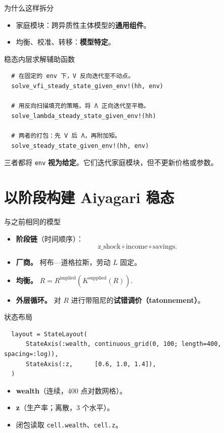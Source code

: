 \documentclass[10pt,aspectratio=169]{beamer}
\begin{document}
\begin{frame}{为什么这样拆分}
  \begin{itemize}
    \item 家庭模块：跨异质性主体模型的\textbf{通用组件}。
    \item 均衡、校准、转移：\textbf{模型特定}。
  \end{itemize}
\end{frame}

\begin{frame}[fragile]{稳态内层求解辅助函数}
  \begin{lstlisting}
  # 在固定的 env 下，V 反向迭代至不动点。
  solve_vfi_steady_state_given_env!(hh, env)

  # 用反向扫描填充的策略，将 Λ 正向迭代至平稳。
  solve_lambda_steady_state_given_env!(hh)

  # 两者的打包：先 V 后 Λ，再附加矩。
  solve_steady_state_given_env!(hh, env)
  \end{lstlisting}
  三者都将 \texttt{env} \textbf{视为给定}。它们迭代家庭模块，但不更新价格或参数。
\end{frame}

\section{以阶段构建 Aiyagari 稳态}

\begin{frame}{与之前相同的模型}
  \begin{itemize}
    \item \textbf{阶段链}（时间顺序）：\[ \text{z\_shock} \circ \text{income} \circ \text{savings}. \]
    \item \textbf{厂商。} 柯布—道格拉斯，劳动 $L$ 固定。
    \item \textbf{均衡。} $R = R^{\mathrm{implied}}(K^{\mathrm{supplied}}(R))$.
    \item \textbf{外层循环。} 对 $R$ 进行带阻尼的\textbf{试错调价（tatonnement）}。
  \end{itemize}
\end{frame}

\begin{frame}[fragile]{状态布局}
  \begin{lstlisting}
  layout = StateLayout(
      StateAxis(:wealth, continuous_grid(0, 100; length=400, spacing=:log)),
      StateAxis(:z,      [0.6, 1.0, 1.4]),
  )
  \end{lstlisting}
  \begin{itemize}
    \item \textbf{wealth}（连续，400 点对数网格）。
    \item \textbf{z}（生产率；离散，3 个水平）。
    \item 闭包读取 \texttt{cell.wealth}、\texttt{cell.z}。
  \end{itemize}
\end{frame}
\end{document}
